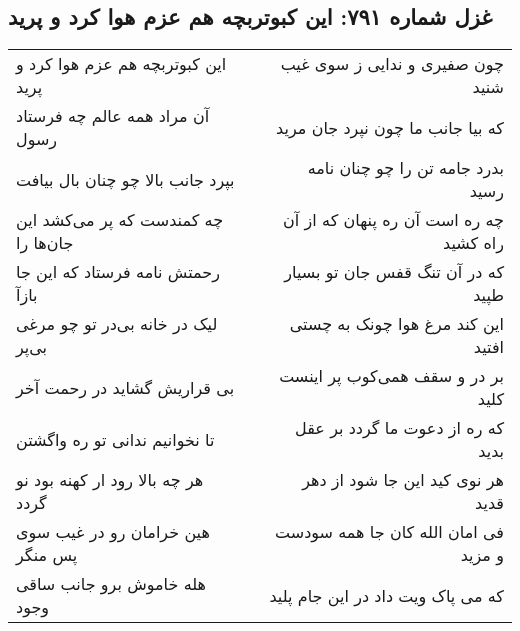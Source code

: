 \begin{center}
\section*{غزل شماره ۷۹۱: این کبوتربچه هم عزم هوا کرد و پرید}
\label{sec:0791}
\begin{longtable}{l p{0.5cm} r}
این کبوتربچه هم عزم هوا کرد و پرید
&&
چون صفیری و ندایی ز سوی غیب شنید
\\
آن مراد همه عالم چه فرستاد رسول
&&
که بیا جانب ما چون نپرد جان مرید
\\
بپرد جانب بالا چو چنان بال بیافت
&&
بدرد جامه تن را چو چنان نامه رسید
\\
چه کمندست که پر می‌کشد این جان‌ها را
&&
چه ره است آن ره پنهان که از آن راه کشید
\\
رحمتش نامه فرستاد که این جا بازآ
&&
که در آن تنگ قفس جان تو بسیار طپید
\\
لیک در خانه بی‌در تو چو مرغی بی‌پر
&&
این کند مرغ هوا چونک به چستی افتید
\\
بی قراریش گشاید در رحمت آخر
&&
بر در و سقف همی‌کوب پر اینست کلید
\\
تا نخوانیم ندانی تو ره واگشتن
&&
که ره از دعوت ما گردد بر عقل بدید
\\
هر چه بالا رود ار کهنه بود نو گردد
&&
هر نوی کید این جا شود از دهر قدید
\\
هین خرامان رو در غیب سوی پس منگر
&&
فی امان الله کان جا همه سودست و مزید
\\
هله خاموش برو جانب ساقی وجود
&&
که می پاک ویت داد در این جام پلید
\\
\end{longtable}
\end{center}
